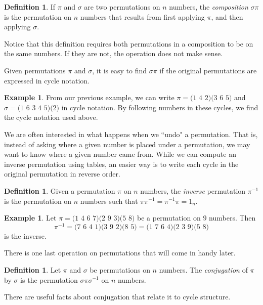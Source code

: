 \documentclass{book}
\theoremstyle{plain}
\theoremstyle{definition}
\newtheorem{definition}[theorem]{Definition}
\newtheorem{example}[theorem]{Example}
\begin{document}
\begin{definition}
If $\pi$ and $\sigma$ are two permutations on $n$ numbers, the {\it composition} $\sigma\pi$ is the permutation on $n$ numbers that results from first applying $\pi$, and then applying $\sigma$.
\end{definition}

Notice that this definition requires both permutations in a composition to be on the same numbers. If they are not, the operation does not make sense.

Given permutations $\pi$ and $\sigma$, it is easy to find $\sigma\pi$ if the original permutations are expressed in cycle notation.

\begin{example}
From our previous example, we can write $\pi = \text{(1 4 2)(3 6 5)}$ and $\sigma = \text{(1 6 3 4 5)(2)}$ in cycle notation. By following numbers in these cycles, we find the cycle notation used above.
\end{example}

We are often interested in what happens when we ``undo" a permutation. That is, instead of asking where a given number is placed under a permutation, we may want to know where a given number came from. While we can compute an inverse permutation using tables, an easier way is to write each cycle in the original permutation in reverse order.

\begin{definition}
Given a permutation $\pi$ on $n$ numbers, the {\it inverse} permutation $\pi^{-1}$ is the permutation on $n$ numbers such that $\pi\pi^{-1} = \pi^{-1}\pi = 1_n$.
\end{definition}

\begin{example}
Let $\pi = \text{(1 4 6 7)(2 9 3)(5 8)}$ be a permutation on $9$ numbers. Then $$\pi^{-1} = \text{(7 6 4 1)(3 9 2)(8 5)} = \text{(1 7 6 4)(2 3 9)(5 8)}$$ is the inverse.
\end{example}

There is one last operation on permutations that will come in handy later.

\begin{definition}
Let $\pi$ and $\sigma$ be permutations on $n$ numbers. The {\it conjugation} of $\pi$ by $\sigma$ is the permutation $\sigma\pi\sigma^{-1}$ on $n$ numbers.
\end{definition}

There are useful facts about conjugation that relate it to cycle structure.
\end{document}
